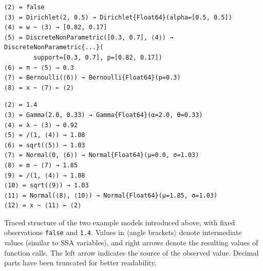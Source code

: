 \newsavebox{\bernoullitrace}
\begin{lrbox}{\bernoullitrace}
\begin{lstlisting}[style=lstfloat]
⟨2⟩ = false
⟨3⟩ = Dirichlet(2, 0.5) → Dirichlet{Float64}(alpha=[0.5, 0.5])
⟨4⟩ = w ~ ⟨3⟩ → [0.82, 0.17]
⟨5⟩ = DiscreteNonParametric([0.3, 0.7], ⟨4⟩) → DiscreteNonParametric{...}(
        support=[0.3, 0.7], p=[0.82, 0.17])
⟨6⟩ = π ~ ⟨5⟩ → 0.3
⟨7⟩ = Bernoulli(⟨6⟩) → Bernoulli{Float64}(p=0.3)
⟨8⟩ = x ~ ⟨7⟩ ← ⟨2⟩
\end{lstlisting}
\end{lrbox}
\newsavebox{\gaussiantrace}
\begin{lrbox}{\gaussiantrace}
\begin{lstlisting}[style=lstfloat]
⟨2⟩ = 1.4
⟨3⟩ = Gamma(2.0, 0.33) → Gamma{Float64}(α=2.0, θ=0.33)
⟨4⟩ = λ ~ ⟨3⟩ → 0.92
⟨5⟩ = /(1, ⟨4⟩) → 1.08
⟨6⟩ = sqrt(⟨5⟩) → 1.03
⟨7⟩ = Normal(0, ⟨6⟩) → Normal{Float64}(μ=0.0, σ=1.03)
⟨8⟩ = m ~ ⟨7⟩ → 1.85
⟨9⟩ = /(1, ⟨4⟩) → 1.08
⟨10⟩ = sqrt(⟨9⟩) → 1.03
⟨11⟩ = Normal(⟨8⟩, ⟨10⟩) → Normal{Float64}(μ=1.85, σ=1.03)
⟨12⟩ = x ~ ⟨11⟩ ← ⟨2⟩
\end{lstlisting}
\end{lrbox}
\begin{lstfloat}[p]
  \loosesubcaptions
  \caption{Traced structure of the two example models introduced above, with fixed observations
    \texttt{false} and \texttt{1.4}.  Values in \(\langle\)angle brackets\(\rangle\) denote
    intermediate values (similar to SSA variables), and right arrows denote the resulting values of
    function calls.  The left arrow indicates the source of the observed value.  Decimal parts have
    been truncated for better readability.}
  \label{lst:trace-examples}
\end{lstfloat}

\FloatBlock

